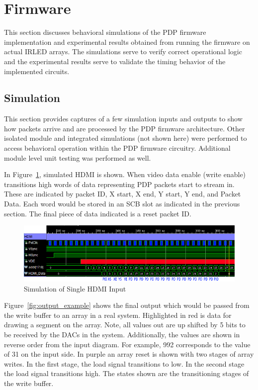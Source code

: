 \section{Firmware}
    This section discusses behavioral simulations of the PDP firmware implementation and experimental results obtained from running the firmware on actual IRLED arrays. The simulations serve to verify correct operational logic and the experimental results serve to validate the timing behavior of the implemented circuits.

    \subsection{Simulation}
    This section provides captures of a few simulation inputs and outputs to show how packets arrive and are processed by the PDP firmware architecture. Other isolated module and integrated simulations (not shown here) were performed to access behavioral operation within the PDP firmware circuitry. Additional module level unit testing was performed as well.

    In Figure~\ref{fig:input_example}, simulated HDMI is shown. When video data enable (write enable) transitions high words of data representing PDP packets start to stream in. These are indicated by packet ID, X start, X end, Y start, Y end, and Packet Data. Each word would be stored in an SCB slot as indicated in the previous section. The final piece of data indicated is a reset packet ID.

    \begin{figure}
        \centering
        \includegraphics[width=1.0\textwidth]{fig/pdp_input_example.png}
        \caption{Simulation of Single HDMI Input}
        \label{fig:input_example}
    \end{figure}

    Figure~\ref{fig:output_example} shows the final output which would be passed from the write buffer to an array in a real system. Highlighted in red is data for drawing a segment on the array. Note, all values out are up shifted by 5 bits to be received by the DACs in the system. Additionally, the values are shown in reverse order from the input diagram. For example, 992 corresponds to the value of 31 on the input side. In purple an array reset is shown with two stages of array writes. In the first stage, the load signal transitions to low. In the second stage the load signal transitions high. The states shown are the transitioning stages of the write buffer.

